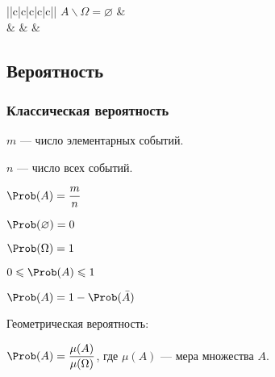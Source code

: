 \begin{tabu}{||c|c|c|c|c||}
{		$\displaystyle A\backslash\Omega = \varnothing $} &
		 \\
	\hline
		 &
		 &
		 &
		 \\
	\hline
\end{tabu}

\subsection{Вероятность}

\subsubsection{Классическая вероятность}

$m$ --- число элементарных событий.

$n$ --- число всех событий.

$\displaystyle \Prob(A) = \frac{m}{n} $

$\displaystyle \Prob(\varnothing) = 0 $

$\displaystyle \Prob(\Omega) = 1 $

$\displaystyle 0 \leqslant \Prob(A) \leqslant 1 $

$\displaystyle \Prob(A) = 1 - \Prob(\bar{A}) $

Геометрическая вероятность:

$\displaystyle \Prob(A) = \frac{\mu(A)}{\mu(\Omega)} $, где $\mu(A)$ --- мера множества $A$.

